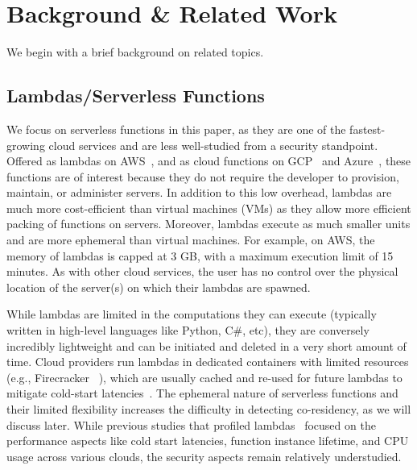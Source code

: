 \section{Background \& Related Work}
\label{sec:background}
We begin with a brief background on related topics.

\subsection{Lambdas/Serverless Functions} 
\label{sec:background:lambdas}

We focus on serverless functions in this paper, as they are one of the
fastest-growing cloud services and are less well-studied from a security
standpoint. Offered as lambdas on AWS~\cite{awslambda}, and as cloud functions
on GCP~\cite{gcpfunctions} and Azure~\cite{azurefunctions}, these functions are
of interest because they do not require the developer to provision, maintain, or
administer servers. In addition to this low overhead, lambdas are much more
cost-efficient than virtual machines (VMs) as they allow more efficient packing
of functions on servers. Moreover, lambdas execute as much smaller units  and
are more ephemeral than virtual machines.  For example, on AWS,
the memory of lambdas is capped at 3 GB, with a maximum execution limit of 15
minutes.  As with other cloud services, the user has no control over the
physical location of the server(s) on which their lambdas are spawned.

While lambdas are limited in the computations they can execute (typically
written in high-level languages like Python, C\#, etc), they are conversely
incredibly lightweight and can be initiated and deleted in a very short amount
of time. Cloud providers run lambdas in dedicated containers with limited
resources (e.g., Firecracker ~\cite{firecracker}), which are usually cached and
re-used for future lambdas to mitigate cold-start
latencies~\cite{awscontainerreuse}. The ephemeral nature of serverless functions
and their limited flexibility increases the difficulty in detecting
co-residency, as we will discuss later. While previous studies that profiled
lambdas~\cite{wangusenix2018} focused on the performance aspects like cold start
latencies, function instance lifetime, and CPU usage across various clouds,
the security aspects remain relatively understudied.



